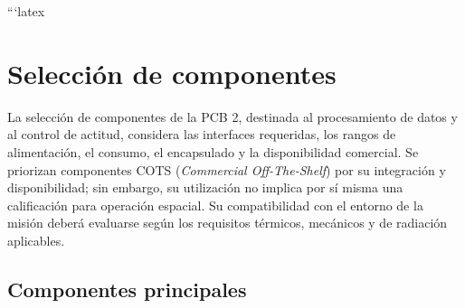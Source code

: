 \documentclass[11pt,a4paper]{article}
\begin{document}
```latex
\section{Selección de componentes}

La selección de componentes de la PCB 2, destinada al procesamiento de
datos y al control de actitud, considera las interfaces requeridas, los
rangos de alimentación, el consumo, el encapsulado y la disponibilidad
comercial. Se priorizan componentes COTS (\textit{Commercial Off-The-Shelf})
por su integración y disponibilidad; sin embargo, su utilización no
implica por sí misma una calificación para operación espacial. Su
compatibilidad con el entorno de la misión deberá evaluarse según los
requisitos térmicos, mecánicos y de radiación aplicables.

\subsection{Componentes principales}
\end{document}
